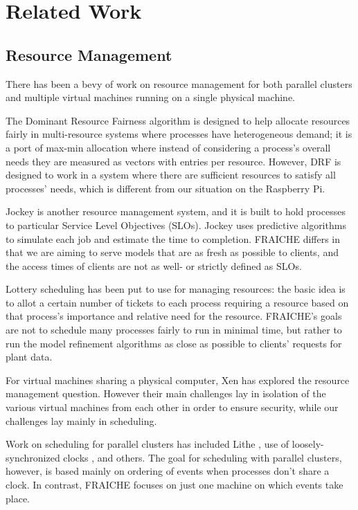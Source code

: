 \documentclass[a4paper]{acm_proc_article-sp}
\begin{document}
\section{Related Work}

\subsection{Resource Management}

There has been a bevy of work on resource management for both parallel clusters and multiple virtual machines running on a single physical machine.

The Dominant Resource Fairness algorithm \cite{} is designed to help allocate resources fairly in multi-resource systems where processes have heterogeneous demand; it is a port of max-min allocation \cite{} where instead of considering a process's overall needs they are measured as vectors with entries per resource.  However, DRF is designed to work in a system where there are sufficient resources to satisfy all processes' needs, which is different from our situation on the Raspberry Pi.

Jockey \cite{} is another resource management system, and it is built to hold processes to particular Service Level Objectives (SLOs).  Jockey uses predictive algorithms to simulate each job and estimate the time to completion.  FRAICHE differs in that we are aiming to serve models that are as fresh as possible to clients, and the access times of clients are not as well- or strictly defined as SLOs.

Lottery scheduling has been put to use for managing resources: the basic idea is to allot a certain number of tickets to each process requiring a resource based on that process's importance and relative need for the resource.  FRAICHE's goals are not to schedule many processes fairly to run in minimal time, but rather to run the model refinement algorithms as close as possible to clients' requests for plant data.

For virtual machines sharing a physical computer, Xen has explored the resource management question.  However their main challenges lay in isolation of the various virtual machines from each other in order to ensure security, while our challenges lay mainly in scheduling.

Work on scheduling for parallel clusters has included Lithe \cite{}, use of loosely-synchronized clocks \cite{}, and others.  The goal for scheduling with parallel clusters, however, is based mainly on ordering of events when processes don't share a clock.  In contrast, FRAICHE focuses on just one machine on which events take place.
\end{document}
